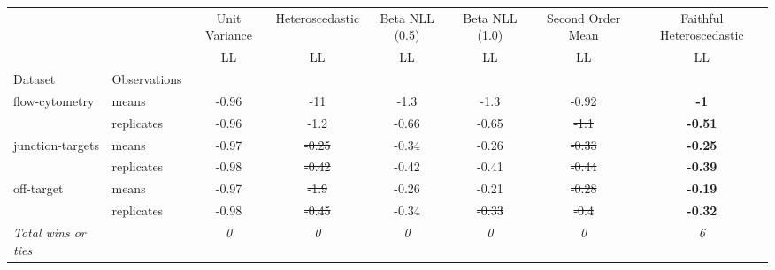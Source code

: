 \begin{tabular}{ll|c|c|c|c|c|c}
\toprule
{} & {} & {Unit Variance} & {Heteroscedastic} & {Beta NLL (0.5)} & {Beta NLL (1.0)} & {Second Order Mean} & {Faithful Heteroscedastic} \\
{} & {} & {LL} & {LL} & {LL} & {LL} & {LL} & {LL} \\
{Dataset} & {Observations} & {} & {} & {} & {} & {} & {} \\
\midrule
\multirow[t]{2}{*}{flow-cytometry} & means & -0.96 & \sout{-11} & -1.3 & -1.3 & \sout{-0.92} & \textbf{-1} \\
 & replicates & -0.96 & -1.2 & -0.66 & -0.65 & \sout{-1.1} & \textbf{-0.51} \\
\multirow[t]{2}{*}{junction-targets} & means & -0.97 & \sout{-0.25} & -0.34 & -0.26 & \sout{-0.33} & \textbf{-0.25} \\
 & replicates & -0.98 & \sout{-0.42} & -0.42 & -0.41 & \sout{-0.44} & \textbf{-0.39} \\
\multirow[t]{2}{*}{off-target} & means & -0.97 & \sout{-1.9} & -0.26 & -0.21 & \sout{-0.28} & \textbf{-0.19} \\
 & replicates & -0.98 & \sout{-0.45} & -0.34 & \sout{-0.33} & \sout{-0.4} & \textbf{-0.32} \\
\textit{{Total wins or ties}} &  & \textit{0} & \textit{0} & \textit{0} & \textit{0} & \textit{0} & \textit{6} \\
\bottomrule
\end{tabular}
